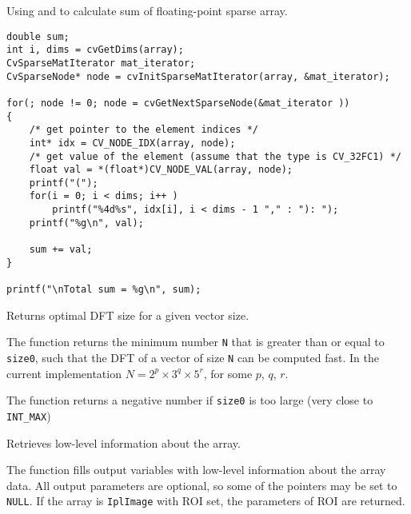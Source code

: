 Using  and  to calculate sum of floating-point sparse array.

\begin{lstlisting}
double sum;
int i, dims = cvGetDims(array);
CvSparseMatIterator mat_iterator;
CvSparseNode* node = cvInitSparseMatIterator(array, &mat_iterator);

for(; node != 0; node = cvGetNextSparseNode(&mat_iterator ))
{
    /* get pointer to the element indices */
    int* idx = CV_NODE_IDX(array, node);
    /* get value of the element (assume that the type is CV_32FC1) */
    float val = *(float*)CV_NODE_VAL(array, node);
    printf("(");
    for(i = 0; i < dims; i++ )
        printf("%4d%s", idx[i], i < dims - 1 "," : "): ");
    printf("%g\n", val);

    sum += val;
}

printf("\nTotal sum = %g\n", sum);
\end{lstlisting}

\fi

Returns optimal DFT size for a given vector size.


\begin{description}
\end{description}

The function returns the minimum number
\texttt{N} that is greater than or equal to \texttt{size0}, such that the DFT
of a vector of size \texttt{N} can be computed fast. In the current
implementation $N=2^p \times 3^q \times 5^r$, for some $p$, $q$, $r$.

The function returns a negative number if \texttt{size0} is too large
(very close to \texttt{INT\_MAX})


\ifC
{}
Retrieves low-level information about the array.


\begin{description}
\end{description}

The function fills output variables with low-level information about the array data. All output parameters are optional, so some of the pointers may be set to \texttt{NULL}. If the array is \texttt{IplImage} with ROI set, the parameters of ROI are returned.

